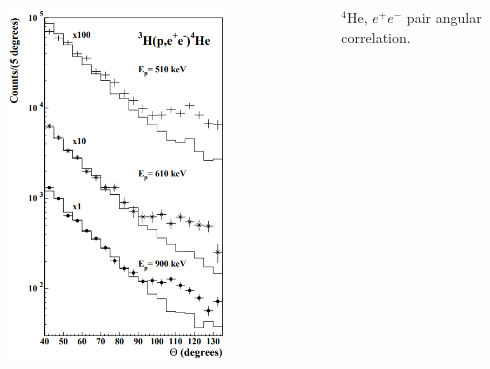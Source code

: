 \documentclass{beamer}
\begin{document}
\begin{frame}
\begin{itemize}
\begin{columns}
\begin{minipage}[t][4cm]{\textwidth}
						\includegraphics[width=0.7\textwidth]{../images/atomki_he.png}\newline
					\end{minipage}
					\footnotesize{$ {}^4\text{He} $, $e^{+}e^{-}$ pair angular correlation.~\cite{atomki_he}}
			\end{columns}
		\end{itemize}
	\end{frame}
\end{document}
